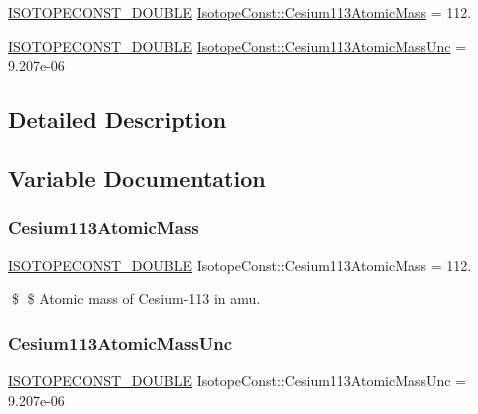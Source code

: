 \begin{DoxyCompactItemize}
\item 
\mbox{\hyperlink{group___isotope_const-_macros_ga8f45a7272ce02c0b4c65c44636ed719a}{I\+S\+O\+T\+O\+P\+E\+C\+O\+N\+S\+T\+\_\+\+D\+O\+U\+B\+LE}} \mbox{\hyperlink{group___isotope_const-_cesium-_cs113_ga1b1f51a81cc0cd1340ecec5b9f5c070e}{Isotope\+Const\+::\+Cesium113\+Atomic\+Mass}} = 112.
\item 
\mbox{\hyperlink{group___isotope_const-_macros_ga8f45a7272ce02c0b4c65c44636ed719a}{I\+S\+O\+T\+O\+P\+E\+C\+O\+N\+S\+T\+\_\+\+D\+O\+U\+B\+LE}} \mbox{\hyperlink{group___isotope_const-_cesium-_cs113_gab798cf25fe4d63571325f79315ce30e7}{Isotope\+Const\+::\+Cesium113\+Atomic\+Mass\+Unc}} = 9.\+207e-\/06
\end{DoxyCompactItemize}


\subsection{Detailed Description}


\subsection{Variable Documentation}
\mbox{\label{group___isotope_const-_cesium-_cs113_ga1b1f51a81cc0cd1340ecec5b9f5c070e}} 
\subsubsection{\texorpdfstring{Cesium113\+Atomic\+Mass}{Cesium113AtomicMass}}
{\footnotesize\ttfamily \mbox{\hyperlink{group___isotope_const-_macros_ga8f45a7272ce02c0b4c65c44636ed719a}{I\+S\+O\+T\+O\+P\+E\+C\+O\+N\+S\+T\+\_\+\+D\+O\+U\+B\+LE}} Isotope\+Const\+::\+Cesium113\+Atomic\+Mass = 112.}

\$ \$ Atomic mass of Cesium-\/113 in amu. \mbox{\label{group___isotope_const-_cesium-_cs113_gab798cf25fe4d63571325f79315ce30e7}} 
\subsubsection{\texorpdfstring{Cesium113\+Atomic\+Mass\+Unc}{Cesium113AtomicMassUnc}}
{\footnotesize\ttfamily \mbox{\hyperlink{group___isotope_const-_macros_ga8f45a7272ce02c0b4c65c44636ed719a}{I\+S\+O\+T\+O\+P\+E\+C\+O\+N\+S\+T\+\_\+\+D\+O\+U\+B\+LE}} Isotope\+Const\+::\+Cesium113\+Atomic\+Mass\+Unc = 9.\+207e-\/06}

